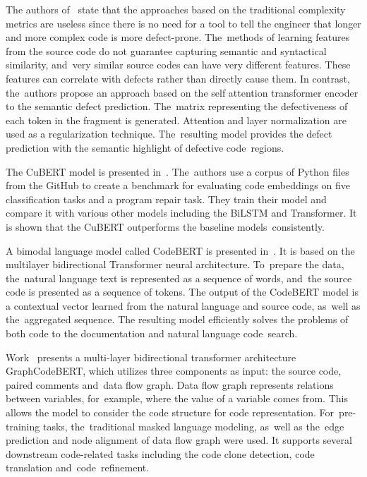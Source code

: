 \documentclass[mathematics,review,accept,moreauthors,pdftex]{Definitions/mdpi}
\begin{document}
The authors of~\cite{HumphreysDam2019} state that the approaches based on the traditional complexity metrics are useless since there is no need for a tool to tell the engineer that longer and more complex code is more defect-prone. The~methods %
of learning features from the source code do not guarantee capturing semantic and syntactical similarity, and~very similar source codes can have very different features. These features can correlate with defects rather than directly cause them.
In contrast, the~authors propose an approach based on the self attention transformer encoder to the semantic defect prediction. The~matrix representing the defectiveness of each token in the fragment is generated. Attention and layer normalization are used as a regularization technique. The~resulting model provides the defect prediction with the semantic highlight of defective code~regions.

The CuBERT model is presented in~\cite{KanadeEtAl2019}. The~authors use a corpus of Python files from the GitHub to create a benchmark for evaluating code embeddings on five classification tasks and a program repair task.
They train their model and compare it with various other models including the BiLSTM and Transformer.
It is shown that the CuBERT outperforms the baseline models~consistently.

A bimodal language model called CodeBERT is presented in~\cite{FengEtAl2020}. It is based on the multilayer bidirectional Transformer neural architecture. To~prepare the data, the~natural language text is represented as a sequence of words, and~the source code is presented as a sequence of tokens.
The output of the CodeBERT model is a contextual vector learned from the natural language and source code, as~well as the~aggregated sequence.
The resulting model efficiently solves the problems of both code to the documentation and natural language code~search. 

Work~\cite{guo2021graphcodebert} presents a multi-layer bidirectional transformer architecture GraphCodeBERT, which utilizes three components as input: the source code, paired comments and~data flow graph. Data flow graph represents relations between variables, for~example, where the value of a variable comes from. This allows the model to consider the code structure for code representation. For~pre-training tasks, the~traditional masked language modeling, as~well as the~edge prediction and node alignment of data flow graph were used.
It supports several downstream code-related tasks including the code clone detection, code translation and~code~refinement.
\end{document}
